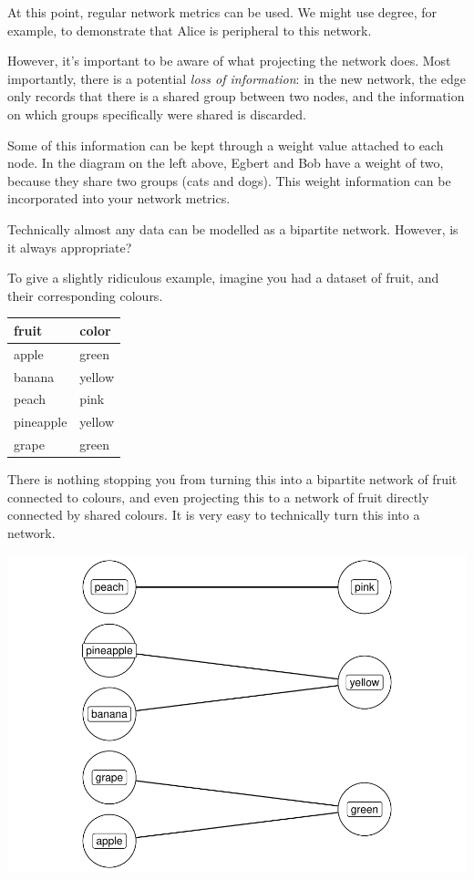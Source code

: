\documentclass[
]{book}
\begin{document}
At this point, regular network metrics can be used. We might use degree, for example, to demonstrate that Alice is peripheral to this network.

However, it's important to be aware of what projecting the network does. Most importantly, there is a potential \emph{loss of information}: in the new network, the edge only records that there is a shared group between two nodes, and the information on which groups specifically were shared is discarded.

Some of this information can be kept through a weight value attached to each node. In the diagram on the left above, Egbert and Bob have a weight of two, because they share two groups (cats and dogs). This weight information can be incorporated into your network metrics.

Technically almost any data can be modelled as a bipartite network. However, is it always appropriate?

To give a slightly ridiculous example, imagine you had a dataset of fruit, and their corresponding colours.

\begin{tabular}[t]{ll}
\toprule
fruit & color\\
\midrule
apple & green\\
banana & yellow\\
peach & pink\\
pineapple & yellow\\
grape & green\\
\bottomrule
\end{tabular}

There is nothing stopping you from turning this into a bipartite network of fruit connected to colours, and even projecting this to a network of fruit directly connected by shared colours. It is very easy to technically turn this into a network.

\includegraphics{_main_files/figure-latex/unnamed-chunk-72-1.pdf}
\end{document}
